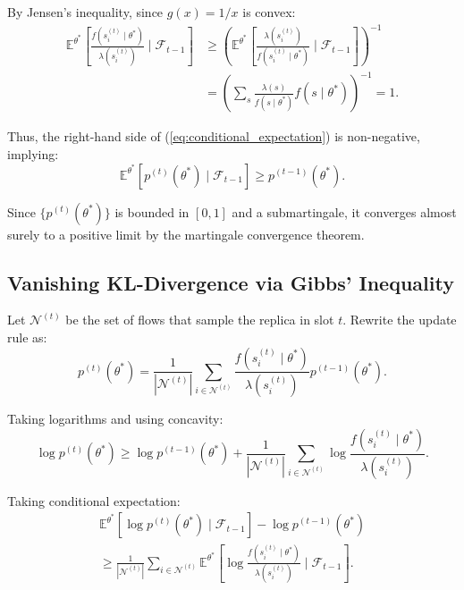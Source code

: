 \documentclass[journal]{IEEEtran}
\theoremstyle{plain}
\theoremstyle{definition}
\theoremstyle{remark}
\begin{document}
By Jensen's inequality, since $g(x) = 1/x$ is convex:
\begin{align}
\mathbb{E}^{\theta^*}\left[ \frac{f(s_i^{(t)} \mid \theta^*)}{\lambda(s_i^{(t)})} \mid \mathcal{F}_{t-1}\right] &\ge \left( \mathbb{E}^{\theta^*}\left[ \frac{\lambda(s_i^{(t)})}{f(s_i^{(t)} \mid \theta^*)} \mid \mathcal{F}_{t-1}\right] \right)^{-1} \nonumber \\
&= \left( \sum_s \frac{\lambda(s)}{f(s \mid \theta^*)} f(s \mid \theta^*) \right)^{-1} = 1.
\end{align}

Thus, the right-hand side of (\ref{eq:conditional_expectation}) is non-negative, implying:
\begin{equation}
\mathbb{E}^{\theta^*}\left[p^{(t)}(\theta^*) \mid \mathcal{F}_{t-1}\right] \ge p^{(t-1)}(\theta^*).
\end{equation}

Since $\{p^{(t)}(\theta^*)\}$ is bounded in $[0,1]$ and a submartingale, it converges almost surely to a positive limit by the martingale convergence theorem.

\subsection{Vanishing KL-Divergence via Gibbs' Inequality}
\label{app:proof_thm3_sec3}

Let $\mathcal{N}^{(t)}$ be the set of flows that sample the replica in slot $t$. Rewrite the update rule as:
\begin{equation}
p^{(t)}(\theta^*) = \frac{1}{|\mathcal{N}^{(t)}|} \sum_{i \in \mathcal{N}^{(t)}} \frac{f(s_i^{(t)} \mid \theta^*)}{\lambda(s_i^{(t)})} p^{(t-1)}(\theta^*). \label{eq:log_update}
\end{equation}

Taking logarithms and using concavity:
\begin{equation}
\log p^{(t)}(\theta^*) \ge \log p^{(t-1)}(\theta^*) + \frac{1}{|\mathcal{N}^{(t)}|} \sum_{i \in \mathcal{N}^{(t)}} \log \frac{f(s_i^{(t)} \mid \theta^*)}{\lambda(s_i^{(t)})}. \label{eq:log_inequality}
\end{equation}

Taking conditional expectation:
\begin{multline}
\mathbb{E}^{\theta^*}\left[\log p^{(t)}(\theta^*) \mid \mathcal{F}_{t-1}\right] 
- \log p^{(t-1)}(\theta^*) \\
\ge \frac{1}{|\mathcal{N}^{(t)}|} \sum_{i \in \mathcal{N}^{(t)}} 
\mathbb{E}^{\theta^*}\left[\log \frac{f(s_i^{(t)} \mid \theta^*)}{\lambda(s_i^{(t)})} \mid \mathcal{F}_{t-1}\right].
\end{multline}
\end{document}
